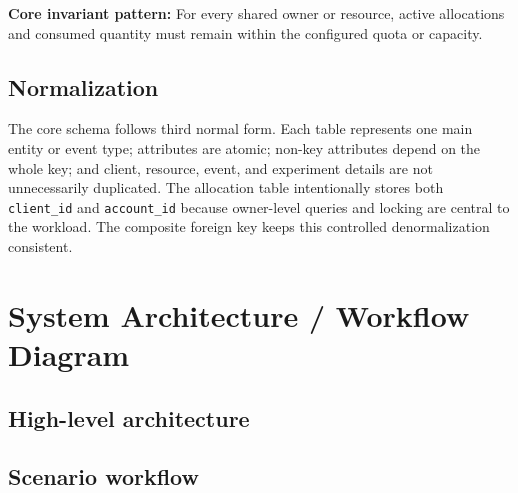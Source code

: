 \documentclass[12pt,a4paper]{article}
\begin{document}
\textbf{Core invariant pattern:} For every shared owner or resource, active allocations and consumed quantity must remain within the configured quota or capacity.

\subsection{Normalization}

The core schema follows third normal form. Each table represents one main entity or event type; attributes are atomic; non-key attributes depend on the whole key; and client, resource, event, and experiment details are not unnecessarily duplicated. The allocation table intentionally stores both \texttt{client\_id} and \texttt{account\_id} because owner-level queries and locking are central to the workload. The composite foreign key keeps this controlled denormalization consistent.

\section{System Architecture / Workflow Diagram}

\subsection{High-level architecture}

\begin{center}
\end{center}

\subsection{Scenario workflow}
\end{document}
